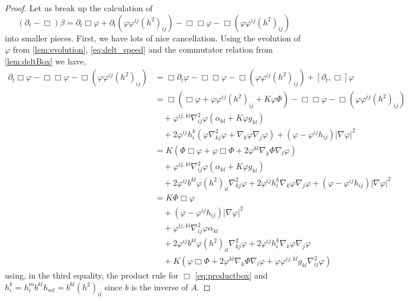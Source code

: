 \documentclass[12pt]{amsart}
\begin{document}
\begin{proof}
Let us break up the calculation of
\[
(\partial_{t} - \Box)\beta =  \partial_{t}\Box\varphi + \partial_{t} (\varphi\varphi^{ij} (h^2)_{ij}) - \Box\Box\varphi - \Box(\varphi\varphi^{ij} (h^2)_{ij})
\]
into smaller pieces. First, we have lots of nice cancellation. Using the evolution of \(\varphi\) from \cref{lem:evolution}, \cref{eq:delt_speed} and the commutator relation from \cref{lem:deltBox} we have,
\begin{equation}
\label{eq:deltbeta1}
\begin{split}
\partial_{t}\Box\varphi - \Box\Box\varphi - \Box(\varphi\varphi^{ij} (h^2)_{ij}) &= \Box\partial_t\varphi - \Box\Box\varphi - \Box(\varphi\varphi^{ij} (h^2)_{ij}) + [\partial_t, \Box] \varphi \\
&= \Box(\Box \varphi + \varphi\varphi^{ij}(h^2)_{ij} + K \varphi\Phi) - \Box\Box\varphi - \Box(\varphi\varphi^{ij} (h^2)_{ij}) \\
&\quad + \varphi^{ij,kl} \nabla^2_{ij} \varphi (\alpha_{kl} + K \varphi g_{kl}) \\
&\quad + 2\varphi^{ij}h^{k}_{i} (\varphi \nabla^2_{kj} \varphi + \nabla_k \varphi \nabla_j \varphi) + (\varphi - \varphi^{ij}h_{ij})| \nabla\varphi|^{2} \\
&= K (\Phi \Box \varphi + \varphi \Box \Phi + 2 \varphi^{kl} \nabla_k \Phi \nabla_l \varphi) \\
&\quad + \varphi^{ij,kl} \nabla^2_{ij} \varphi (\alpha_{kl} + K \varphi g_{kl}) \\
&\quad + 2\varphi^{ij}b^{kl} \varphi (h^2)_{il} \nabla^2_{kj} \varphi + 2\varphi^{ij}h^{k}_{i} \nabla_k \varphi \nabla_j \varphi + (\varphi - \varphi^{ij}h_{ij})| \nabla\varphi|^{2} \\
&= K \Phi \Box \varphi  \\
&\quad + (\varphi - \varphi^{ij}h_{ij})| \nabla\varphi|^{2} \\
&\quad + \varphi^{ij,kl} \nabla^2_{ij} \varphi \alpha_{kl} \\
&\quad + 2\varphi^{ij}b^{kl} \varphi (h^2)_{il} \nabla^2_{kj} \varphi + 2\varphi^{ij}h^{k}_{i} \nabla_k \varphi \nabla_j \varphi \\
&\quad + K(\varphi \Box \Phi + 2 \varphi^{kl} \nabla_k \Phi \nabla_l \varphi + \varphi \varphi^{ij,kl} g_{kl} \nabla^2_{ij} \varphi)
\end{split}
\end{equation}
using, in the third equality, the product rule for \(\Box\) \cref{eq:productbox} and \(h^k_i = h^m_i b^{kl}h_{ml} = b^{kl} (h^2)_{il}\) since \(b\) is the inverse of \(A\).


\end{proof}
\end{document}
